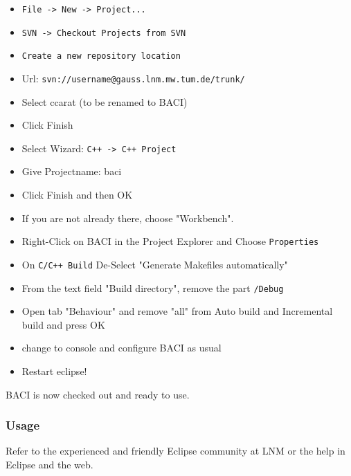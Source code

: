 \begin{itemize}
\item \texttt{File -> New -> Project...}
\item  \texttt{SVN -> Checkout Projects from SVN}
\item  \texttt{Create a new repository location}
\item  Url: \texttt{svn://username@gauss.lnm.mw.tum.de/trunk/}

\item Select ccarat (to be renamed to BACI)

\item Click Finish

\item Select Wizard: \texttt{C++ -> C++ Project}

\item Give Projectname: baci

\item Click Finish and then OK

\item If you are not already there, choose "Workbench".

\item Right-Click on BACI in the Project Explorer and Choose \texttt{Properties}

\item On \texttt{C/C++ Build} De-Select "Generate Makefiles automatically"

\item From the text field "Build directory", remove the part \texttt{/Debug}

\item Open tab "Behaviour" and remove "all" from Auto build and Incremental build and press OK

\item change to console and configure BACI as usual

\item Restart eclipse!

\end{itemize}
BACI is now checked out and ready to use.

\subsubsection{Usage}

Refer to the experienced and friendly Eclipse community at LNM or the help in Eclipse and the web.
